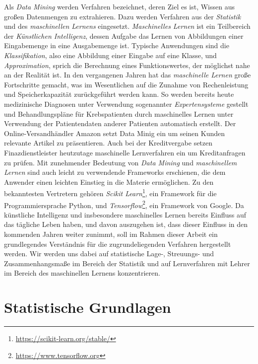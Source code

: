 \documentclass[fontsize=11pt]{scrartcl}
\begin{document}
            Als \emph{Data Mining} werden Verfahren bezeichnet, deren Ziel es ist, Wissen aus großen Datenmengen zu extrahieren. Dazu werden Verfahren aus der \emph{Statistik} und des \emph{maschinellen Lernens} eingesetzt.\cite{ertel2016}
            \emph{Maschinelles Lernen} ist ein Teilbereich der \emph{Künstlichen Intelligenz}, dessen Aufgabe das Lernen von Abbildungen einer Eingabemenge in eine Ausgabemenge ist. Typische Anwendungen sind die \emph{Klassifikation}, also eine Abbildung einer Eingabe auf eine Klasse, und \emph{Approximation}, sprich die Berechnung eines Funktionswertes, der möglichst nahe an der Realität ist\cite{ertel2016,mlfor}.
            In den vergangenen Jahren hat das \emph{maschinelle Lernen} große Fortschritte gemacht, was im Wesentlichen auf die Zunahme von Rechenleistung und Speicherkapazität zurückgeführt werden kann.\cite{mlfor}
            So werden bereits heute medizinische Diagnosen unter Verwendung sogenannter \emph{Expertensysteme} gestellt\cite{ertel2016} und Behandlungspläne für Krebspatienten durch maschinelles Lernen unter Verwendung der Patientendaten anderer Patienten automatisch erstellt.\cite{mlfor}
            Der Online-Versandhändler Amazon setzt Data Minig ein um seinen Kunden relevante Artikel zu präsentieren.\cite{ertel2016}
            Auch bei der Kreditvergabe setzen Finazdienstleister heutzutage maschinelle Lernverfahren ein um Kreditanfragen zu prüfen.\cite{mlfor}
            Mit zunehmender Bedeutung von \emph{Data Mining} und \emph{maschinellem Lernen} sind auch leicht zu verwendende Frameworks erschienen, die dem Anwender einen leichten Einstieg in die Materie ermöglichen. Zu den bekanntesten Vertretern gehören \emph{Scikit Learn}\footnote{\url{https://scikit-learn.org/stable/}}, ein Framework für die Programmiersprache Python, und \emph{Tensorflow}\footnote{\url{https://www.tensorflow.org}}, ein Framework von Google.
            Da künstliche Intelligenz und insbesondere maschinelles Lernen bereits Einfluss auf das tägliche Leben haben, und davon auszugehen ist, dass dieser Einfluss in den kommenden Jahren weiter zunimmt, soll im Rahmen dieser Arbeit ein grundlegendes Verständnis für die zugrundeliegenden Verfahren hergestellt werden. Wir werden uns dabei auf statistische Lage-, Streuungs- und Zusammenhangsmaße im Bereich der Statistik und auf Lernverfahren mit Lehrer im Bereich des maschinellen Lernens konzentrieren.

        \section{Statistische Grundlagen}
\end{document}
